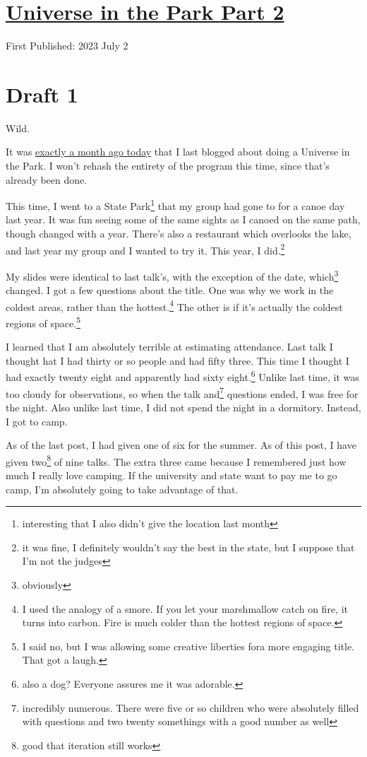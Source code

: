 \documentclass[12pt]{article}[titlepage]
\newcommand{\1}{\={a}}
\newcommand{\2}{\={e}}
\newcommand{\3}{\={\i}}
\newcommand{\4}{\=o}
\newcommand{\5}{\=u}
\newcommand{\6}{\={A}}
\renewcommand{\,}{\textsuperscript{,}}
\begin{document}
\doublespacing
\section{\href{universe-2.html}{Universe in the Park Part 2}}
First Published: 2023 July 2
\section{Draft 1}
Wild.

It was \href{universe.html}{exactly a month ago today} that I last blogged about doing a Universe in the Park.
I won't rehash the entirety of the program this time, since that's already been done.

This time, I went to a State Park\footnote{interesting that I also didn't give the location last month} that my group had gone to for a canoe day last year.
It was fun seeing some of the same sights as I canoed on the same path, though changed with a year.
There's also a restaurant which overlooks the lake, and last year my group and I wanted to try it.
This year, I did.\footnote{it was fine, I definitely wouldn't say the best in the state, but I suppose that I'm not the judges}

My slides were identical to last talk's, with the exception of the date, which\footnote{obviously} changed.
I got a few questions about the title.
One was why we work in the coldest areas, rather than the hottest.\footnote{I used the analogy of a smore. If you let your marshmallow catch on fire, it turns into carbon.
Fire is much colder than the hottest regions of space.}
The other is if it's actually the coldest regions of space.\footnote{I said no, but I was allowing some creative liberties fora  more engaging title.
That got a laugh.}

I learned that I am absolutely terrible at estimating attendance.
Last talk I thought hat I had thirty or so people and had fifty three.
This time I thought I had exactly twenty eight and apparently had sixty eight.\footnote{also a dog? Everyone assures me it was adorable.}
Unlike last time, it was too cloudy for observations, so when the talk and\footnote{incredibly numerous. There were five or so children who were absolutely filled with questions and two twenty somethings with a good number as well} questions ended, I was free for the night.
Also unlike last time, I did not spend the night in a dormitory.
Instead, I got to camp.

As of the last post, I had given one of six for the summer.
As of this post, I have given two\footnote{good that iteration still works} of nine talks.
The extra three came because I remembered just how much I really love camping.
If the university and state want to pay me to go camp, I'm absolutely going to take advantage of that.
\end{document}
